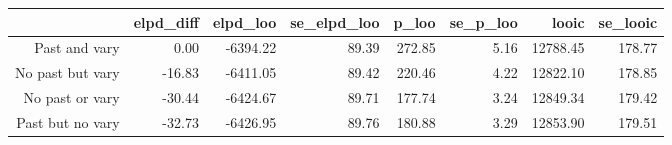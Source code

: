 \begin{table}[ht]
\centering
\begin{tabular}{rrrrrrrr}
  \hline
 & elpd\_diff & elpd\_loo & se\_elpd\_loo & p\_loo & se\_p\_loo & looic & se\_looic \\ 
  \hline
Past and vary & 0.00 & -6394.22 & 89.39 & 272.85 & 5.16 & 12788.45 & 178.77 \\ 
  No past but vary & -16.83 & -6411.05 & 89.42 & 220.46 & 4.22 & 12822.10 & 178.85 \\ 
  No past or vary & -30.44 & -6424.67 & 89.71 & 177.74 & 3.24 & 12849.34 & 179.42 \\ 
  Past but no vary & -32.73 & -6426.95 & 89.76 & 180.88 & 3.29 & 12853.90 & 179.51 \\ 
   \hline
\end{tabular}
\end{table}
